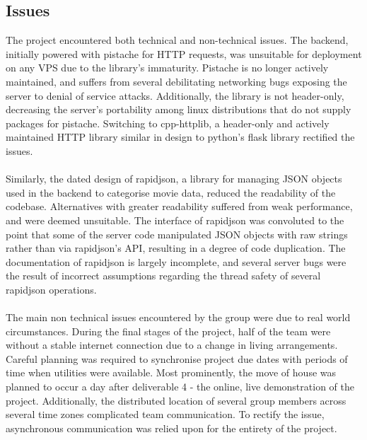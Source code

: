 \documentclass{article}
\begin{document}
\subsection{Issues}
The project encountered both technical and non-technical issues. The backend,
initially powered with pistache for HTTP requests, was unsuitable for
deployment on any VPS due to the library's immaturity. Pistache is no longer
actively maintained, and suffers from several debilitating networking bugs
exposing the server to denial of service attacks. Additionally, the library is
not header-only, decreasing the server's portability among linux distributions
that do not supply packages for pistache. Switching to cpp-httplib, a
header-only and actively maintained HTTP library similar in design to python's
flask library rectified the issues. \\\\
Similarly, the dated design of rapidjson, a
library for managing JSON objects used in the backend to categorise movie data,
reduced the readability of the codebase. Alternatives with greater readability
suffered from weak performance, and were deemed unsuitable. The interface of
rapidjson was convoluted to the point that some of the server code manipulated
JSON objects with raw strings rather than via rapidjson's API, resulting in
a degree of code duplication. The documentation of rapidjson is largely
incomplete, and several server bugs were the result of incorrect assumptions
regarding the thread safety of several rapidjson operations.\\\\
The main non technical issues encountered by the group were due to real world
circumstances. During the final stages of the project, half of the team were
without a stable internet connection due to a change in living arrangements.
Careful planning was required to synchronise project due dates with periods
of time when utilities were available. Most prominently, the move of house
was planned to occur a day after deliverable 4 - the online, live demonstration
of the project. Additionally, the distributed location of several group members
across several time zones complicated team communication. To rectify the issue,
asynchronous communication was relied upon for the entirety of the project.
\end{document}
